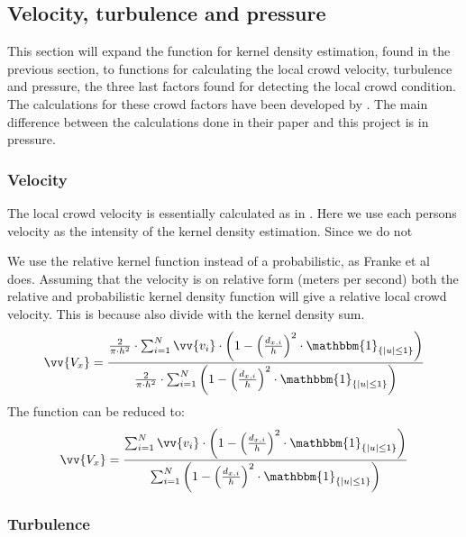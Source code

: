 

\subsection{Velocity, turbulence and pressure}
This section will expand the function for kernel density estimation, found in the previous section, to functions for calculating the local crowd velocity, turbulence and pressure, the three last factors found for detecting the local crowd condition. The calculations for these crowd factors have been developed by \citet{wirz2012inferring}. The main difference between the calculations done in their paper and this project is in pressure. 

\subsubsection{Velocity}
The local crowd velocity is essentially calculated as in \citet{wirz2012inferring}. Here we use each persons velocity as the intensity of the kernel density estimation. Since we do not 

We use the relative kernel function instead of a probabilistic, as Franke et al does. Assuming that the velocity is on relative form (meters per second) both the relative and probabilistic kernel density function will give a relative local crowd velocity. This is because also divide with the kernel density sum. 
\begin{equation}
\label{eq:}
\vv{V_x} = \frac{\frac{2}{\pi \cdot h^2} \cdot \sum_{i=1}^N \vv{v_i} \cdot \left(1-\left(\frac{d_{x,i}}{h}\right)^2 \cdot \mathbbm{1}_{\{|u| \leq 1\} }\right)}{\frac{2}{\pi \cdot h^2} \cdot \sum_{i=1}^N \left(1-\left(\frac{d_{x,i}}{h}\right)^2 \cdot \mathbbm{1}_{\{|u| \leq 1\} }\right)}
\end{equation}
The function can be reduced to:
\begin{equation}
\label{eq:}
\vv{V_x} = \frac{\sum_{i=1}^N \vv{v_i} \cdot \left(1-\left(\frac{d_{x,i}}{h}\right)^2 \cdot \mathbbm{1}_{\{|u| \leq 1\} }\right)}{\sum_{i=1}^N \left(1-\left(\frac{d_{x,i}}{h}\right)^2 \cdot \mathbbm{1}_{\{|u| \leq 1\} }\right)}
\end{equation}

\subsubsection{Turbulence}


